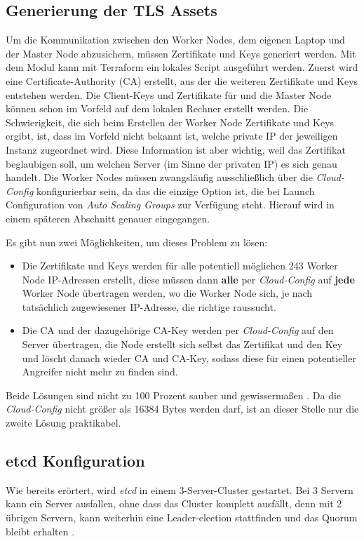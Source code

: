 \subsection{Generierung der TLS Assets}
Um die Kommunikation zwischen den Worker Nodes, dem eigenen Laptop und der
Master Node abzusichern,
müssen Zertifikate und Keys generiert werden. Mit dem  Modul kann mit
Terraform ein lokales Script ausgeführt werden.
Zuerst wird eine Certificate-Authority (CA) erstellt, aus der die weiteren
Zertifikate und Keys entstehen werden.
Die Client-Keys und Zertifikate für  und die Master Node können
schon im Vorfeld
auf dem lokalen Rechner erstellt werden.
Die Schwierigkeit, die sich beim Erstellen der Worker Node Zertifikate und Keys
ergibt,
ist, dass im Vorfeld nicht bekannt ist, welche private IP der jeweiligen Instanz
zugeordnet wird.
Diese Information ist aber wichtig, weil das Zertifikat beglaubigen
soll, um welchen
Server (im Sinne der privaten IP) es sich genau handelt.
Die Worker Nodes müssen zwangsläufig ausschließlich über die \emph{Cloud-Config}
konfigurierbar sein,
da das die einzige Option ist, die bei Launch Configuration von
\emph{Auto Scaling Groups} zur Verfügung steht.
Hierauf wird in einem späteren Abschnitt genauer eingegangen.

Es gibt nun zwei Möglichkeiten, um dieses Problem zu lösen:
\begin{itemize}
  \item Die Zertifikate und Keys werden für alle potentiell möglichen 243
  Worker Node
  IP-Adressen erstellt,
  diese müssen dann \textbf{alle} per \emph{Cloud-Config} auf \textbf{jede} Worker Node
  übertragen werden, wo die Worker Node sich,
  je nach tats\"achlich zugewiesener IP-Adresse, die richtige raussucht.
  \item Die CA und der dazugehörige CA-Key werden per \emph{Cloud-Config} auf den
  Server übertragen,
  die Node erstellt sich selbst das Zertifikat und den Key und löscht danach
  wieder CA und CA-Key,
  sodass diese für einen potentieller Angreifer nicht mehr zu finden sind.
\end{itemize}

Beide Lösungen sind nicht zu 100 Prozent sauber und gewissermaßen .
Da die \emph{Cloud-Config} nicht größer als 16384 Bytes \cite{AwsCloudConfig} werden
darf,
ist an dieser Stelle nur die zweite Lösung praktikabel.

\subsection{etcd Konfiguration}
Wie bereits erörtert, wird \emph{etcd} in einem 3-Server-Cluster gestartet.
Bei 3 Servern kann ein Server ausfallen, ohne dass das Cluster komplett ausfällt,
denn mit 2 übrigen Servern, kann weiterhin eine Leader-election stattfinden und
das Quorum bleibt erhalten \cite{etcdclustersize}.

